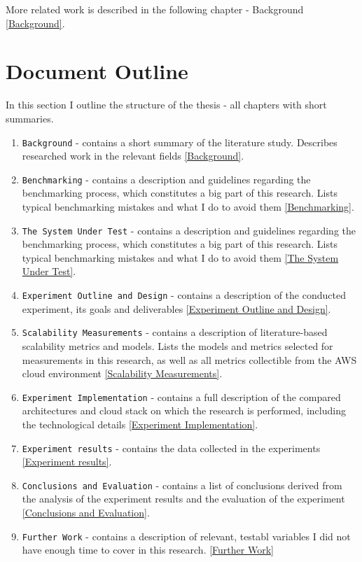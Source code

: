 \documentclass{uvamscse}
\begin{document}
More related work is described in the following chapter - Background \ref{Background}.

\section{Document Outline}
In this section I outline the structure of the thesis - all chapters with short summaries.

\begin{enumerate}
  \item \texttt{Background} - contains a short summary of the literature study. Describes researched work in the relevant fields \ref{Background}.
  \item \texttt{Benchmarking} - contains a description and guidelines regarding the benchmarking process, which constitutes a big part of this research. Lists typical benchmarking mistakes and what I do to avoid them \ref{Benchmarking}.
  \item \texttt{The System Under Test} - contains a description and guidelines regarding the benchmarking process, which constitutes a big part of this research. Lists typical benchmarking mistakes and what I do to avoid them \ref{The System Under Test}.
  \item \texttt{Experiment Outline and Design} - contains a description of the conducted experiment, its goals and deliverables \ref{Experiment Outline and Design}.
  \item \texttt{Scalability Measurements} - contains a description of literature-based scalability metrics and models. Lists the models and metrics selected for measurements in this research, as well as all metrics collectible from the AWS cloud environment \ref{Scalability Measurements}.
  \item \texttt{Experiment Implementation} - contains a full description of the compared architectures and cloud stack on which the research is performed, including the technological details \ref{Experiment Implementation}.
  \item \texttt{Experiment results} - contains the data collected in the experiments \ref{Experiment results}.
  \item \texttt{Conclusions and Evaluation} - contains a list of conclusions derived from the analysis of the experiment results and the evaluation of the experiment \ref{Conclusions and Evaluation}.
  \item \texttt{Further Work} - contains a description of relevant, testabl variables I did not have enough time to cover in this research. \ref{Further Work}
\end{enumerate}
\end{document}
